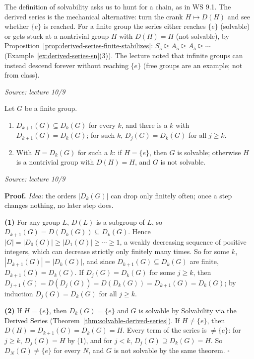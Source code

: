 \documentclass[11pt]{report}
\renewenvironment{proof}[1][Proof]{\noindent\textbf{#1.} }{\hfill$\square$\par\vspace{5pt}}
\newcommand{\srcline}[1]{\par\hfill{\footnotesize\textit{Source: #1}}}
\begin{document}
\begin{rembox}\label{rem:derived-series-crank}
The definition of solvability asks us to hunt for a chain, as in WS 9.1. The derived series is the mechanical alternative: turn the crank $H \mapsto D(H)$ and see whether $\{e\}$ is reached. For a finite group the series either reaches $\{e\}$ (solvable) or gets stuck at a nontrivial group $H$ with $D(H) = H$ (not solvable), by Proposition~\ref{prop:derived-series-finite-stabilizes}: $S_5 \trianglerighteq A_5 \trianglerighteq A_5 \trianglerighteq \cdots$ (Example~\ref{ex:derived-series-sn}(3)). The lecture noted that infinite groups can instead descend forever without reaching $\{e\}$ (free groups are an example; not from class).
\srcline{lecture 10/9}
\end{rembox}

\begin{propbox}\label{prop:derived-series-finite-stabilizes}
Let $G$ be a finite group.
\begin{enumerate}
    \item $D_{k+1}(G) \subseteq D_k(G)$ for every $k$, and there is a $k$ with $D_{k+1}(G) = D_k(G)$; for such $k$, $D_j(G) = D_k(G)$ for all $j \geq k$.
    \item With $H = D_k(G)$ for such a $k$: if $H = \{e\}$, then $G$ is solvable; otherwise $H$ is a nontrivial group with $D(H) = H$, and $G$ is not solvable.
\end{enumerate}
\srcline{lecture 10/9}
\end{propbox}

\begin{proof}
\textit{Idea:} the orders $|D_k(G)|$ can drop only finitely often; once a step changes nothing, no later step does.\par
\textbf{(1)} For any group $L$, $D(L)$ is a subgroup of $L$, so $D_{k+1}(G) = D(D_k(G)) \subseteq D_k(G)$. Hence $|G| = |D_0(G)| \geq |D_1(G)| \geq \cdots \geq 1$, a weakly decreasing sequence of positive integers, which can decrease strictly only finitely many times. So for some $k$, $|D_{k+1}(G)| = |D_k(G)|$, and since $D_{k+1}(G) \subseteq D_k(G)$ are finite, $D_{k+1}(G) = D_k(G)$. If $D_j(G) = D_k(G)$ for some $j \geq k$, then $D_{j+1}(G) = D(D_j(G)) = D(D_k(G)) = D_{k+1}(G) = D_k(G)$; by induction $D_j(G) = D_k(G)$ for all $j \geq k$.

\textbf{(2)} If $H = \{e\}$, then $D_k(G) = \{e\}$ and $G$ is solvable by Solvability via the Derived Series (Theorem~\ref{thm:solvable-derived-series}). If $H \neq \{e\}$, then $D(H) = D_{k+1}(G) = D_k(G) = H$. Every term of the series is $\neq \{e\}$: for $j \geq k$, $D_j(G) = H$ by (1), and for $j < k$, $D_j(G) \supseteq D_k(G) = H$. So $D_N(G) \neq \{e\}$ for every $N$, and $G$ is not solvable by the same theorem.
\end{proof}
\end{document}
